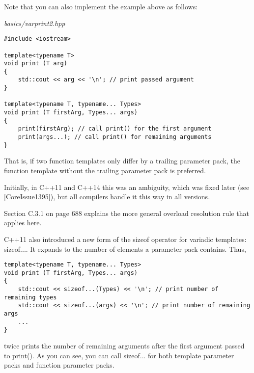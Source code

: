 
Note that you can also implement the example above as follows:

\noindent
\textit{basics/varprint2.hpp}
\begin{lstlisting}[style=styleCXX]
#include <iostream>

template<typename T>
void print (T arg)
{
	std::cout << arg << '\n'; // print passed argument
}

template<typename T, typename... Types>
void print (T firstArg, Types... args)
{
	print(firstArg); // call print() for the first argument
	print(args...); // call print() for remaining arguments
}
\end{lstlisting}

That is, if two function templates only differ by a trailing parameter pack, the function template without the trailing parameter pack is preferred.

\begin{tcolorbox}[colback=webgreen!5!white,colframe=webgreen!75!black]
\hspace*{0.75cm}Initially, in C++11 and C++14 this was an ambiguity, which was fixed later (see [CoreIssue1395]), but all compilers handle it this way in all versions.
\end{tcolorbox}

Section C.3.1 on page 688 explains the more general overload resolution rule that applies here.


C++11 also introduced a new form of the sizeof operator for variadic templates: sizeof.... It expands to the number of elements a parameter pack contains. Thus,

\begin{lstlisting}[style=styleCXX]
template<typename T, typename... Types>
void print (T firstArg, Types... args)
{
	std::cout << sizeof...(Types) << '\n'; // print number of remaining types
	std::cout << sizeof...(args) << '\n'; // print number of remaining args
	...
}
\end{lstlisting}

twice prints the number of remaining arguments after the first argument passed to print(). As you can see, you can call sizeof... for both template parameter packs and function parameter packs.

